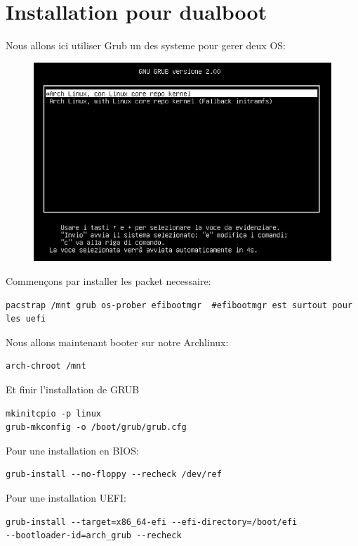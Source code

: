 \documentclass[a4paper]{book}
\begin{document}
\section{Installation pour dualboot}
Nous allons ici utiliser Grub un des systeme pour gerer deux OS\@:\\
\begin{figure}[h]
  \includegraphics[width=\textwidth]{images/grub}
\end{figure}
Commençons par installer les packet necessaire\@:\\
\begin{lstlisting}
pacstrap /mnt grub os-prober efibootmgr  #efibootmgr est surtout pour les uefi
\end{lstlisting}
Nous allons maintenant booter sur notre Archlinux\@:\\
\begin{lstlisting}
arch-chroot /mnt
\end{lstlisting}
Et finir l'installation de GRUB\\
\begin{lstlisting}
mkinitcpio -p linux
grub-mkconfig -o /boot/grub/grub.cfg
\end{lstlisting}
Pour une installation en BIOS\@:\\
\begin{lstlisting}
grub-install --no-floppy --recheck /dev/ref
\end{lstlisting}
Pour une installation UEFI\@:\\
\begin{lstlisting}
grub-install --target=x86_64-efi --efi-directory=/boot/efi
--bootloader-id=arch_grub --recheck
\end{lstlisting}
\end{document}

